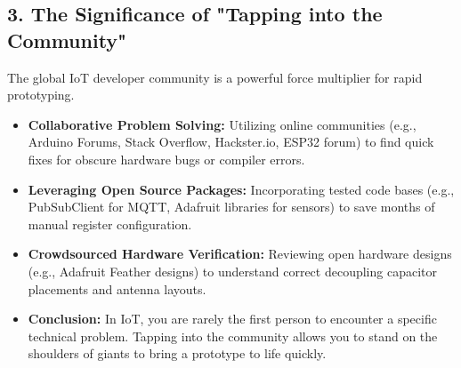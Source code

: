 \subsection{3. The Significance of "Tapping into the Community"}
The global IoT developer community is a powerful force multiplier for rapid prototyping.
\begin{itemize}
  \item   \textbf{Collaborative Problem Solving:} Utilizing online communities (e.g., Arduino Forums, Stack Overflow, Hackster.io, ESP32 forum) to find quick fixes for obscure hardware bugs or compiler errors.
  \item   \textbf{Leveraging Open Source Packages:} Incorporating tested code bases (e.g., PubSubClient for MQTT, Adafruit libraries for sensors) to save months of manual register configuration.
  \item   \textbf{Crowdsourced Hardware Verification:} Reviewing open hardware designs (e.g., Adafruit Feather designs) to understand correct decoupling capacitor placements and antenna layouts.
  \item   \textbf{Conclusion:} In IoT, you are rarely the first person to encounter a specific technical problem. Tapping into the community allows you to stand on the shoulders of giants to bring a prototype to life quickly.
\end{itemize}
